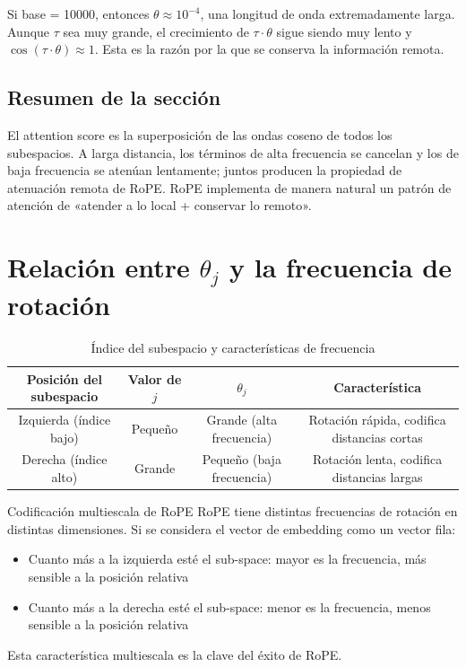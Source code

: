 \documentclass[a4paper]{article}
\begin{document}
Si base = 10000, entonces $\theta \approx 10^{-4}$, una longitud de onda extremadamente larga. Aunque $\tau$ sea muy grande, el crecimiento de $\tau \cdot \theta$ sigue siendo muy lento y $\cos(\tau \cdot \theta) \approx 1$. Esta es la razón por la que se conserva la información remota.

\subsection{Resumen de la sección}

El attention score es la superposición de las ondas coseno de todos los subespacios. A larga distancia, los términos de alta frecuencia se cancelan y los de baja frecuencia se atenúan lentamente; juntos producen la propiedad de atenuación remota de RoPE. RoPE implementa de manera natural un patrón de atención de «atender a lo local + conservar lo remoto».

\section{Relación entre $\theta_j$ y la frecuencia de rotación}

\begin{table}[H]
\centering
\caption{Índice del subespacio y características de frecuencia}
\begin{tabular}{cccc}
\toprule
\textbf{Posición del subespacio} & \textbf{Valor de $j$} & \textbf{$\theta_j$} & \textbf{Característica} \\
\midrule
Izquierda (índice bajo) & Pequeño & Grande (alta frecuencia) & Rotación rápida, codifica distancias cortas \\
Derecha (índice alto) & Grande & Pequeño (baja frecuencia) & Rotación lenta, codifica distancias largas \\
\bottomrule
\end{tabular}
\end{table}

\begin{knowledgebox}{Codificación multiescala de RoPE}
RoPE tiene distintas frecuencias de rotación en distintas dimensiones. Si se considera el vector de embedding como un vector fila:
\begin{itemize}
  \item Cuanto más a la izquierda esté el sub-space: mayor es la frecuencia, más sensible a la posición relativa
  \item Cuanto más a la derecha esté el sub-space: menor es la frecuencia, menos sensible a la posición relativa
\end{itemize}
Esta característica multiescala es la clave del éxito de RoPE.
\end{knowledgebox}
\end{document}
